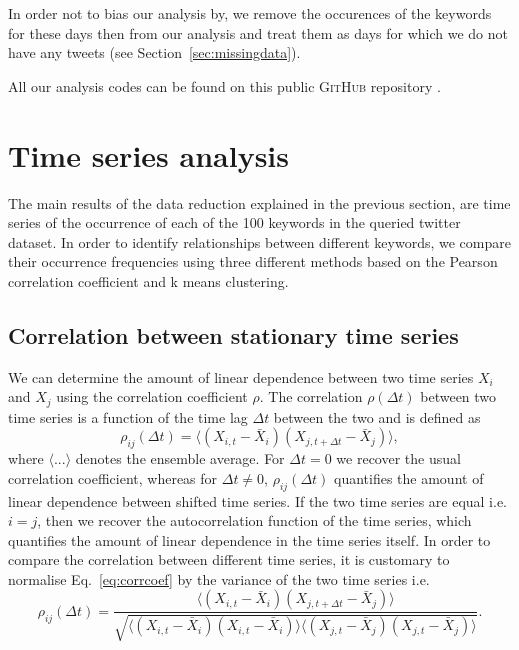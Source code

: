 \documentclass[12pt, a4paper]{article}
\begin{document}
In order not to bias our analysis by, we remove the occurences of the keywords for these days then from our analysis and treat them as days for which we do not have any tweets (see Section~\ref{sec:missingdata}).

All our analysis codes can be found on this public \textsc{GitHub} repository \cite{github}.

\section{Time series analysis}
The main results of the data reduction explained in the previous section, are time series of the occurrence of each of the 100 keywords in the queried twitter dataset. In order to identify relationships between different keywords, we compare their occurrence frequencies using three different methods based on the Pearson correlation coefficient and k means clustering. 

\subsection{Correlation between stationary time series}
We can determine the amount of linear dependence between two time series $X_{i}$ and $X_{j}$ using the correlation coefficient $\rho$. The correlation $\rho(\Delta t)$ between two time series is a function of the time lag $\Delta t$ between the two and is defined as \cite{dettling14}
\begin{equation}
\rho_{ij}(\Delta t) = \langle (X_{i, t}-\bar{X}_{i}) (X_{j, t+\Delta t}-\bar{X}_{j}) \rangle, \label{eq:corrcoef}
\end{equation} 
where $\langle ... \rangle$ denotes the ensemble average. For $\Delta t = 0$ we recover the usual correlation coefficient, whereas for $\Delta t \neq 0$, $\rho_{ij}(\Delta t)$ quantifies the amount of linear dependence between shifted time series. If the two time series are equal i.e. $i = j$, then we recover the autocorrelation function of the time series, which quantifies the amount of linear dependence in the time series itself. In order to compare the correlation between different time series, it is customary to normalise Eq.~\ref{eq:corrcoef} by the variance of the two time series i.e. \cite{dettling14}
\begin{equation}
\rho_{ij}(\Delta t) = \frac{\langle (X_{i, t}-\bar{X}_{i}) (X_{j, t+\Delta t}-\bar{X}_{j}) \rangle}{\sqrt{\langle (X_{i, t}-\bar{X}_{i}) (X_{i, t}-\bar{X}_{i}) \rangle \langle (X_{j, t}-\bar{X}_{j}) (X_{j, t}-\bar{X}_{j}) \rangle}}. \label{eq:corrcoef1}
\end{equation} 
\end{document}
